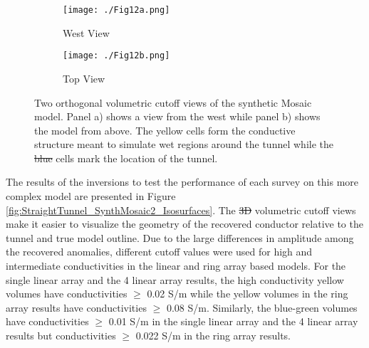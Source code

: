 \documentclass[preprint,authoryear,12pt]{elsarticle}
\providecommand{\DIFaddtex}[1]{{\protect\color{blue}\uwave{#1}}} %
\providecommand{\DIFdeltex}[1]{{\protect\color{red}\sout{#1}}}                      %
\providecommand{\DIFaddbegin}{} %
\providecommand{\DIFaddend}{} %
\providecommand{\DIFdelbegin}{} %
\providecommand{\DIFdelend}{} %
\providecommand{\DIFaddFL}[1]{\DIFadd{#1}} %
\providecommand{\DIFdelFL}[1]{\DIFdel{#1}} %
\providecommand{\DIFaddbeginFL}{} %
\providecommand{\DIFaddendFL}{} %
\providecommand{\DIFdelbeginFL}{} %
\providecommand{\DIFdelendFL}{} %
\providecommand{\DIFadd}[1]{\texorpdfstring{\DIFaddtex{#1}}{#1}} %
\providecommand{\DIFdel}[1]{\texorpdfstring{\DIFdeltex{#1}}{}} %
\begin{document}
\begin{figure}[htp]{}
   \begin{center}
      \begin{subfigure}{0.54\linewidth}
         \DIFdelbeginFL %
\DIFdelendFL \DIFaddbeginFL {}
         \texttt{[image: ./Fig12a.png]}
         \DIFaddendFL \caption{West View}
         \label{fig:StraightTunnel_SynthMosaic2_TrueMod_West}
      \end{subfigure}
      \hspace{-2.5cm}
      \qquad
      \begin{subfigure}{0.54\linewidth}
         \DIFdelbeginFL %
\DIFdelendFL \DIFaddbeginFL \texttt{[image: ./Fig12b.png]}
         \DIFaddendFL \caption{Top View}
         \label{fig:StraightTunnel_SynthMosaic2_TrueMod_Top}
      \end{subfigure}
   \end{center}
\vspace{-0.4cm}
\caption{Two orthogonal volumetric cutoff views of the synthetic Mosaic model. Panel a) shows a view from the west while panel b) shows the model from above. The yellow cells form the conductive structure meant to simulate wet regions around the tunnel while the \DIFdelbeginFL \DIFdelFL{blue }\DIFdelendFL \DIFaddbeginFL \DIFaddFL{dark purple }\DIFaddendFL cells mark the location of the tunnel.}
\label{fig:StraightTunnel_SynthMosaic2_TrueMod}
\end{figure}


The results of the inversions to test the performance of each survey on this more complex model are presented in Figure \ref{fig:StraightTunnel_SynthMosaic2_Isosurfaces}. The \DIFdelbegin \DIFdel{3D }\DIFdelend \DIFaddbegin \DIFadd{3-D }\DIFaddend volumetric cutoff views make it easier to visualize the geometry of the recovered conductor relative to the tunnel and true model outline. Due to the large differences in amplitude among the recovered anomalies, different cutoff values were used for high and intermediate conductivities in the linear and ring array based models. For the single linear array and the 4 linear array results, the high conductivity yellow volumes have conductivities $\geq$ 0.02 S/m while the yellow volumes in the ring array results have conductivities $\geq$ 0.08 S/m. Similarly, the blue-green volumes have conductivities $\geq$ 0.01 S/m in the single linear array and the 4 linear array results but conductivities $\geq$ 0.022 S/m in the ring array results.
\end{document}
